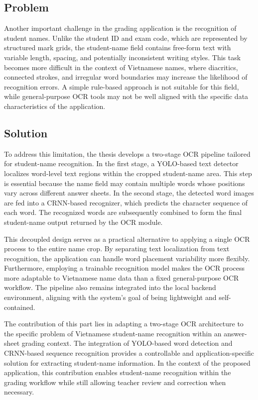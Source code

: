 \documentclass[../Main.tex]{subfiles}
\begin{document}
\subsection{Problem}
\label{subsection:5.2.1}

Another important challenge in the grading application is the recognition of student names. Unlike the student ID and exam code, which are represented by structured mark grids, the student-name field contains free-form text with variable length, spacing, and potentially inconsistent writing styles. This task becomes more difficult in the context of Vietnamese names, where diacritics, connected strokes, and irregular word boundaries may increase the likelihood of recognition errors. A simple rule-based approach is not suitable for this field, while general-purpose OCR tools may not be well aligned with the specific data characteristics of the application.

\subsection{Solution}
\label{subsection:5.2.2}

To address this limitation, the thesis develops a two-stage OCR pipeline tailored for student-name recognition. In the first stage, a YOLO-based text detector localizes word-level text regions within the cropped student-name area. This step is essential because the name field may contain multiple words whose positions vary across different answer sheets. In the second stage, the detected word images are fed into a CRNN-based recognizer, which predicts the character sequence of each word. The recognized words are subsequently combined to form the final student-name output returned by the OCR module.

This decoupled design serves as a practical alternative to applying a single OCR process to the entire name crop. By separating text localization from text recognition, the application can handle word placement variability more flexibly. Furthermore, employing a trainable recognition model makes the OCR process more adaptable to Vietnamese name data than a fixed general-purpose OCR workflow. The pipeline also remains integrated into the local backend environment, aligning with the system's goal of being lightweight and self-contained.

The contribution of this part lies in adapting a two-stage OCR architecture to the specific problem of Vietnamese student-name recognition within an answer-sheet grading context. The integration of YOLO-based word detection and CRNN-based sequence recognition provides a controllable and application-specific solution for extracting student-name information. In the context of the proposed application, this contribution enables student-name recognition within the grading workflow while still allowing teacher review and correction when necessary.
\end{document}
